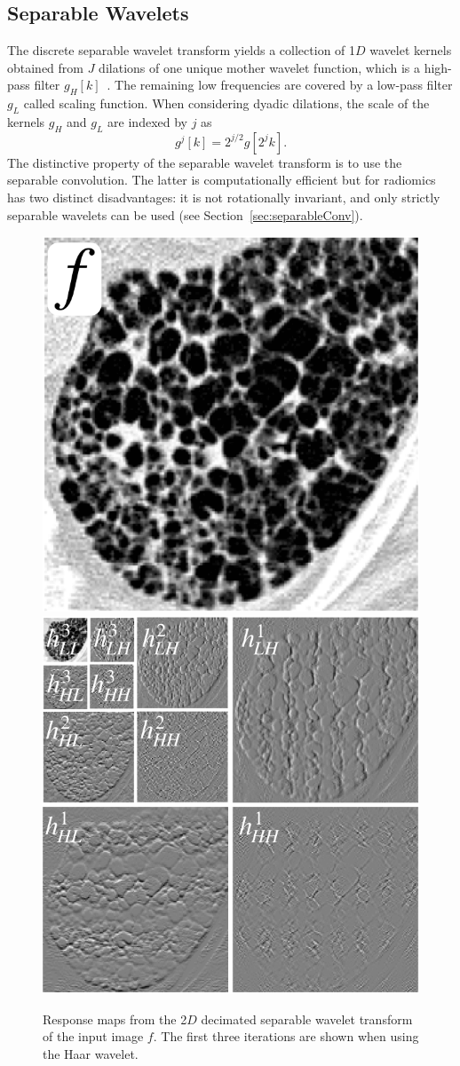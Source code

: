 \documentclass[fleqn,a4paper,oneside,openany]{book}
\begin{document}
\subsection{Separable Wavelets}\label{sec:separableWavelets}
%
The discrete separable wavelet transform yields a collection of 1$D$ wavelet kernels obtained from $J$ dilations of one unique mother wavelet function, which is a high-pass filter $g_H[k]$~\cite{Dau1992}.
The remaining low frequencies are covered by a low-pass filter $g_L$ called scaling function.
When considering dyadic dilations, the scale of the kernels $g_H$ and $g_L$ are indexed by $j$ as
%
\begin{equation}\label{eq:wavelets}
g^j[k] = 2^{j/2}g[2^j k].
\end{equation}
%
The distinctive property of the separable wavelet transform is to use the separable convolution. 
The latter is computationally efficient but for radiomics has two distinct disadvantages: it is not rotationally invariant, and only strictly separable wavelets can be used (see Section~\ref{sec:separableConv}). 
%
\begin{figure}
\centering
\includegraphics[trim = 0 0 0 0, clip, width=0.4\linewidth]{f.png}
\includegraphics[trim = 0 0 0 0, clip, width=0.4\linewidth]{decimatedWT.png}\\
\caption{Response maps from the 2$D$ decimated separable wavelet transform of the input image $f$.
The first three iterations are shown when using the Haar wavelet.}
  \label{fig:decimatedWT}
\end{figure}
\end{document}

